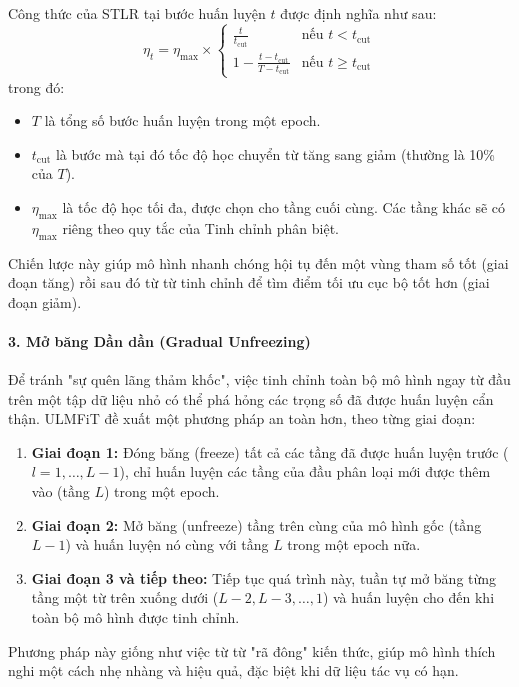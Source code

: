 Công thức của STLR tại bước huấn luyện $t$ được định nghĩa như sau:
\begin{equation}
\eta_t = \eta_{\max} \times
\begin{cases}
    \frac{t}{t_{\text{cut}}} & \text{nếu } t < t_{\text{cut}} \\
    1 - \frac{t - t_{\text{cut}}}{T - t_{\text{cut}}} & \text{nếu } t \ge t_{\text{cut}}
\end{cases}
\label{eq:stlr}
\end{equation}
trong đó:
\begin{itemize}
    \item $T$ là tổng số bước huấn luyện trong một epoch.
    \item $t_{\text{cut}}$ là bước mà tại đó tốc độ học chuyển từ tăng sang giảm (thường là 10\% của $T$).
    \item $\eta_{\max}$ là tốc độ học tối đa, được chọn cho tầng cuối cùng. Các tầng khác sẽ có $\eta_{\max}$ riêng theo quy tắc của Tinh chỉnh phân biệt.
\end{itemize}
Chiến lược này giúp mô hình nhanh chóng hội tụ đến một vùng tham số tốt (giai đoạn tăng) rồi sau đó từ từ tinh chỉnh để tìm điểm tối ưu cục bộ tốt hơn (giai đoạn giảm).

\paragraph{3. Mở băng Dần dần (Gradual Unfreezing)}
Để tránh "sự quên lãng thảm khốc", việc tinh chỉnh toàn bộ mô hình ngay từ đầu trên một tập dữ liệu nhỏ có thể phá hỏng các trọng số đã được huấn luyện cẩn thận. ULMFiT đề xuất một phương pháp an toàn hơn, theo từng giai đoạn:

\begin{enumerate}
    \item \textbf{Giai đoạn 1:} Đóng băng (freeze) tất cả các tầng đã được huấn luyện trước ($l=1, \dots, L-1$), chỉ huấn luyện các tầng của đầu phân loại mới được thêm vào (tầng $L$) trong một epoch.
    \item \textbf{Giai đoạn 2:} Mở băng (unfreeze) tầng trên cùng của mô hình gốc (tầng $L-1$) và huấn luyện nó cùng với tầng $L$ trong một epoch nữa.
    \item \textbf{Giai đoạn 3 và tiếp theo:} Tiếp tục quá trình này, tuần tự mở băng từng tầng một từ trên xuống dưới ($L-2, L-3, \dots, 1$) và huấn luyện cho đến khi toàn bộ mô hình được tinh chỉnh.
\end{enumerate}
Phương pháp này giống như việc từ từ "rã đông" kiến thức, giúp mô hình thích nghi một cách nhẹ nhàng và hiệu quả, đặc biệt khi dữ liệu tác vụ có hạn.

